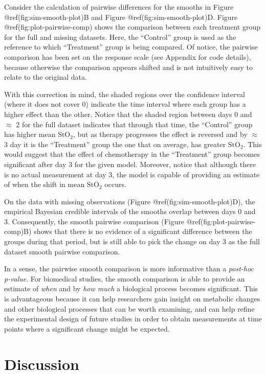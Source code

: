 \documentclass[Royal,times,sagev]{sagej}
\begin{document}
Consider the calculation of pairwise differences for the smooths in
Figure @ref(fig:sim-smooth-plot)B and Figure @ref(fig:sim-smooth-plot)D.
Figure @ref(fig:plot-pairwise-comp) shows the comparison between each
treatment group for the full and missing datasets. Here, the ``Control''
group is used as the reference to which ``Treatment'' group is being
compared. Of notice, the pairwise comparison has been set on the
response scale (see Appendix for code details), because otherwise the
comparison appears shifted and is not intuitively easy to relate to the
original data.

With this correction in mind, the shaded regions over the confidence
interval (where it does not cover 0) indicate the time interval where
each group has a higher effect than the other. Notice that the shaded
region between days 0 and \(\approx\) 2 for the full dataset indicates
that through that time, the ``Control'' group has higher mean
\(\mbox{StO}_2\), but as therapy progresses the effect is reversed and
by \(\approx\) 3 day it is the ``Treatment'' group the one that on
average, has greater \(\mbox{StO}_2\). This would suggest that the
effect of chemotherapy in the ``Treatment'' group becomes significant
after day 3 for the given model. Moreover, notice that although there is
no actual measurement at day 3, the model is capable of providing an
estimate of when the shift in mean \(\mbox{StO}_2\) occurs.

On the data with missing observations (Figure
@ref(fig:sim-smooth-plot)D), the empirical Bayesian credible intervals
of the smooths overlap between days 0 and 3. Consequently, the smooth
pairwise comparison (Figure @ref(fig:plot-pairwise-comp)B) shows that
there is no evidence of a significant difference between the groups
during that period, but is still able to pick the change on day 3 as the
full dataset smooth pairwise comparison.

In a sense, the pairwise smooth comparison is more informative than a
\emph{post-hoc} \emph{p-value}. For biomedical studies, the smooth
comparison is able to provide an estimate of \emph{when} and by
\emph{how much} a biological process becomes significant. This is
advantageous because it can help researchers gain insight on metabolic
changes and other biological processes that can be worth examining, and
can help refine the experimental design of future studies in order to
obtain measurements at time points where a significant change might be
expected.

\hypertarget{discussion}{%
\section{Discussion}\label{discussion}}
\end{document}
